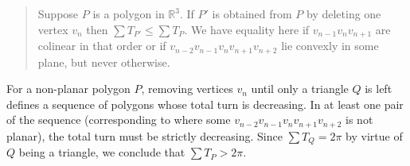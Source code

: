 \documentclass{article}
\begin{document}
\begin{quotation}
	Suppose \(P\) is a polygon in \(\mathbb{R}^3\). If \(P'\) is obtained from \(P\) by deleting one vertex \(v_n\) then \(\sum T_{P'} \leq \sum T_P\). We have equality here if \(v_{n-1} v_n v_{n+1}\) are colinear in that order or if \(v_{n-2} v_{n-1} v_n v_{n+1} v_{n+2}\) lie convexly in some plane, but never otherwise.
\end{quotation}

For a non-planar polygon \(P\), removing vertices \(v_n\) until only a triangle \(Q\) is left defines a sequence of polygons whose total turn is decreasing. In at least one pair of the sequence (corresponding to where some \(v_{n-2} v_{n-1} v_{n} v_{n+1} v_{n+2}\) is not planar), the total turn must be strictly decreasing.  Since \(\sum T_Q = 2\pi\) by virtue of \(Q\) being a triangle, we conclude that  \(\sum T_P > 2\pi\).
\end{document}
